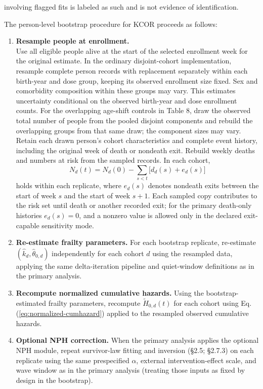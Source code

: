 \documentclass[
]{article}
\begin{document}
involving flagged fits is labeled as such and is not evidence of identification.

The person-level bootstrap procedure for KCOR proceeds as follows:

\begin{enumerate}
\def\labelenumi{\arabic{enumi}.}
\item
  \textbf{Resample people at enrollment.}\\
  Use all eligible people alive at the start of the selected enrollment week for the original estimate. In the ordinary disjoint-cohort implementation, resample complete person records with replacement separately within each birth-year and dose group, keeping its observed enrollment size fixed. Sex and comorbidity composition within these groups may vary. This estimates uncertainty conditional on the observed birth-year and dose enrollment counts. For the overlapping age-shift controls in Table 8, draw the observed total number of people from the pooled disjoint components and rebuild the overlapping groups from that same draw; the component sizes may vary. Retain each drawn person's cohort characteristics and complete event history, including the original week of death or nondeath exit. Rebuild weekly deaths and numbers at risk from the sampled records. In each cohort, \[N_d(t)=N_d(0)-\sum_{s<t}\big[d_d(s)+e_d(s)\big]\] holds within each replicate, where \(e_d(s)\) denotes nondeath exits between the start of week \(s\) and the start of week \(s+1\). Each sampled copy contributes to the risk set until death or another recorded exit; for the primary death-only histories \(e_d(s)=0\), and a nonzero value is allowed only in the declared exit-capable sensitivity mode.
\item
  \textbf{Re-estimate frailty parameters.} For each bootstrap replicate, re-estimate \((\hat{k}_d,\hat{\theta}_{0,d})\) independently for each cohort \(d\) using the resampled data, applying the same delta-iteration pipeline and quiet-window definitions as in the primary analysis.
\item
  \textbf{Recompute normalized cumulative hazards.} Using the bootstrap-estimated frailty parameters, recompute \(\tilde H_{0,d}(t)\) for each cohort using Eq. (\ref{eq:normalized-cumhazard}) applied to the resampled observed cumulative hazards.
\item
  \textbf{Optional NPH correction.} When the primary analysis applies the optional NPH module, repeat survivor-law fitting and inversion (§2.5; §2.7.3) on each replicate using the same prespecified \(\alpha\), external intervention-effect scale, and wave window as in the primary analysis (treating those inputs as fixed by design in the bootstrap).

\end{enumerate}
\end{document}
